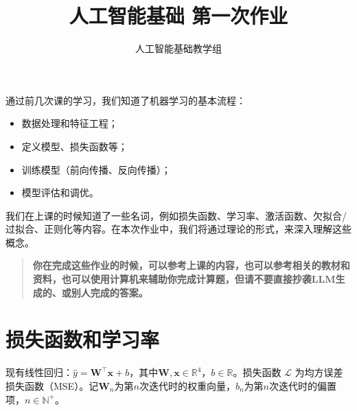 \documentclass[12pt]{ctexart}
\title{\textbf{人工智能基础 \quad 第一次作业}}
\author{人工智能基础教学组}
\date{}
\begin{document}
\maketitle

通过前几次课的学习，我们知道了机器学习的基本流程：
\begin{itemize}
    \item 数据处理和特征工程；
    \item 定义模型、损失函数等；
    \item 训练模型（前向传播、反向传播）；
    \item 模型评估和调优。
\end{itemize}
我们在上课的时候知道了一些名词，例如损失函数、学习率、激活函数、欠拟合/过拟合、正则化等内容。在本次作业中，我们将通过理论的形式，来深入理解这些概念。

\begin{quote}
    \color{red}
    \textbf{你在完成这些作业的时候，可以参考上课的内容，也可以参考相关的教材和资料，也可以使用计算机来辅助你完成计算题，但请不要直接抄袭LLM生成的、或别人完成的答案。}
\end{quote}



\section{损失函数和学习率}

现有线性回归：$\hat{y} = \mathbf{W}^\top \mathbf{x} + b$，其中$\mathbf{W}, \mathbf{x} \in \mathbb{R}^4$，$b \in \mathbb{R}$。损失函数 $\mathcal{L}$ 为均方误差损失函数（MSE）。记$\mathbf{W}_{n}$为第$n$次迭代时的权重向量，$b_n$为第$n$次迭代时的偏置项，$n \in \mathbb{N}^+$。
\end{document}
